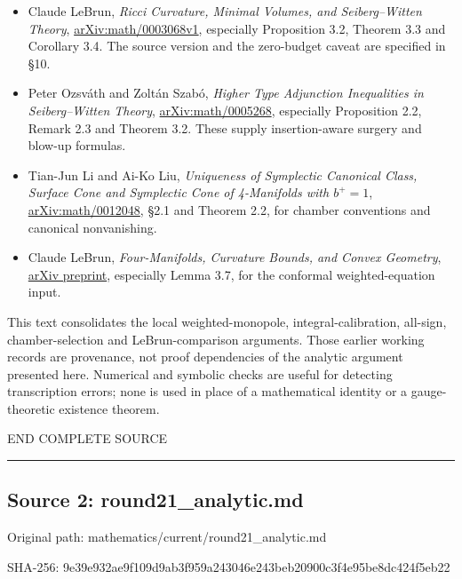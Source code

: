 \documentclass[
  10pt,
]{article}
\providecommand{\tightlist}{%
  \setlength{\itemsep}{0pt}\setlength{\parskip}{0pt}}
\begin{document}
\begin{itemize}
\tightlist
\item
  Claude LeBrun, \emph{Ricci Curvature, Minimal Volumes, and
  Seiberg--Witten Theory},
  \href{https://arxiv.org/pdf/math/0003068}{arXiv:math/0003068v1},
  especially Proposition 3.2, Theorem 3.3 and Corollary 3.4. The source
  version and the zero-budget caveat are specified in §10.
\item
  Peter Ozsváth and Zoltán Szabó, \emph{Higher Type Adjunction
  Inequalities in Seiberg--Witten Theory},
  \href{https://arxiv.org/pdf/math/0005268}{arXiv:math/0005268},
  especially Proposition 2.2, Remark 2.3 and Theorem 3.2. These supply
  insertion-aware surgery and blow-up formulas.
\item
  Tian-Jun Li and Ai-Ko Liu, \emph{Uniqueness of Symplectic Canonical
  Class, Surface Cone and Symplectic Cone of 4-Manifolds with
  \(b^+=1\)},
  \href{https://arxiv.org/pdf/math/0012048}{arXiv:math/0012048}, §2.1
  and Theorem 2.2, for chamber conventions and canonical nonvanishing.
\item
  Claude LeBrun, \emph{Four-Manifolds, Curvature Bounds, and Convex
  Geometry}, \href{https://arxiv.org/pdf/math/0611450}{arXiv preprint},
  especially Lemma 3.7, for the conformal weighted-equation input.
\end{itemize}

This text consolidates the local weighted-monopole,
integral-calibration, all-sign, chamber-selection and LeBrun-comparison
arguments. Those earlier working records are provenance, not proof
dependencies of the analytic argument presented here. Numerical and
symbolic checks are useful for detecting transcription errors; none is
used in place of a mathematical identity or a gauge-theoretic existence
theorem.

END COMPLETE SOURCE

\begin{center}\rule{0.5\linewidth}{0.5pt}\end{center}

\hypertarget{source-2-round21_analytic.md}{%
\subsection{Source 2:
round21\_analytic.md}\label{source-2-round21_analytic.md}}

Original path: mathematics/current/round21\_analytic.md

SHA-256:
9e39e932ae9f109d9ab3f959a243046e243beb20900c3f4e95be8dc424f5eb22
\end{document}

